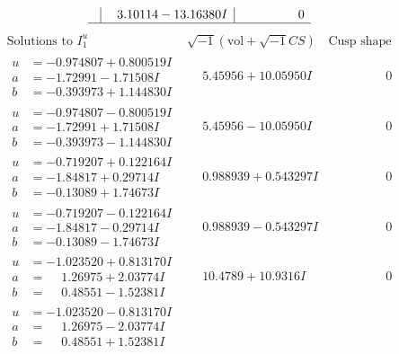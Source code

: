 \documentclass[1p]{elsarticle_modified}
\theoremstyle{definition}
\newcommand{\I}{\sqrt{-1}}
\begin{document}
$$\begin{array}{c|c|c}
 & \phantom{-}3.10114 - 13.16380 I & \phantom{-0.000000 } 0\\
 \hline 
 \end{array}$$\newpage$$\begin{array}{c|c|c}  
\text{Solutions to }I^u_{1}& \I (\text{vol} + \sqrt{-1}CS) & \text{Cusp shape}\\
 \hline 
\begin{aligned}
u &= -0.974807 + 0.800519 I \\
a &= -1.72991 - 1.71508 I \\
b &= -0.393973 + 1.144830 I\end{aligned}
 & \phantom{-}5.45956 + 10.05950 I & \phantom{-0.000000 } 0 \\ \hline\begin{aligned}
u &= -0.974807 - 0.800519 I \\
a &= -1.72991 + 1.71508 I \\
b &= -0.393973 - 1.144830 I\end{aligned}
 & \phantom{-}5.45956 - 10.05950 I & \phantom{-0.000000 } 0 \\ \hline\begin{aligned}
u &= -0.719207 + 0.122164 I \\
a &= -1.84817 + 0.29714 I \\
b &= -0.13089 + 1.74673 I\end{aligned}
 & \phantom{-}0.988939 + 0.543297 I & \phantom{-0.000000 } 0 \\ \hline\begin{aligned}
u &= -0.719207 - 0.122164 I \\
a &= -1.84817 - 0.29714 I \\
b &= -0.13089 - 1.74673 I\end{aligned}
 & \phantom{-}0.988939 - 0.543297 I & \phantom{-0.000000 } 0 \\ \hline\begin{aligned}
u &= -1.023520 + 0.813170 I \\
a &= \phantom{-}1.26975 + 2.03774 I \\
b &= \phantom{-}0.48551 - 1.52381 I\end{aligned}
 & \phantom{-}10.4789 + 10.9316 I & \phantom{-0.000000 } 0 \\ \hline\begin{aligned}
u &= -1.023520 - 0.813170 I \\
a &= \phantom{-}1.26975 - 2.03774 I \\
b &= \phantom{-}0.48551 + 1.52381 I\end{aligned}

\end{array}$$
\end{document}
